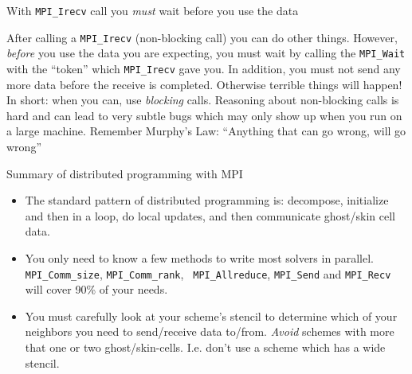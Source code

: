 \documentclass[aspectratio=169]{beamer}
\begin{document}
\begin{frame}{With {\tt MPI\_Irecv} call you \emph{must} wait before
    you use the data}
  
  After calling a {\tt MPI\_Irecv} (non-blocking call) you can do
  other things. However, \emph{before} you use the data you are
  expecting, you must wait by calling the {\tt MPI\_Wait} with the
  ``token'' which {\tt MPI\_Irecv} gave you.%
  \vskip0.1in%
  In addition, you must not send any more data before the receive is
  completed. Otherwise terrible things will happen!%
  \vskip0.1in%
  {\color{blue} In short: when you can, use \emph{blocking}
    calls. Reasoning about non-blocking calls is hard and can lead to
    very subtle bugs which may only show up when you run on a large
    machine. Remember Murphy's Law: ``Anything that can go wrong, will
    go wrong''}

\end{frame}

\begin{frame}{Summary of distributed programming with MPI}

  \begin{itemize}
  \item The standard pattern of distributed programming is: decompose,
    initialize and then in a loop, do local updates, and then
    communicate ghost/skin cell data.
  \item You only need to know a few methods to write most solvers in
    parallel. {\tt MPI\_Comm\_size}, {\tt MPI\_Comm\_rank}, {\tt
      MPI\_Allreduce}, {\tt MPI\_Send} and {\tt MPI\_Recv} will cover
    90\% of your needs.
  \item You must carefully look at your scheme's stencil to determine
    which of your neighbors you need to send/receive data
    to/from. \emph{Avoid} schemes with more that one or two
    ghost/skin-cells. I.e. don't use a scheme which has a wide
    stencil.
  \end{itemize}

\end{frame}
\end{document}
